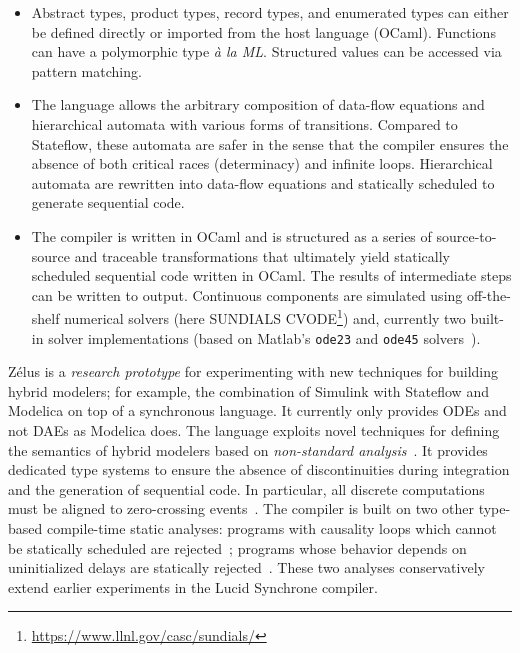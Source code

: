 \documentclass[11pt,titlepage,twoside]{report}
\newenvironment{flatitemize}
  {\begin{itemize}[leftmargin=*]}
  {\end{itemize}}
\newcommand{\zelus}{{\sf Z\'elus}}
\newcommand{\lucy}{{\sf Lucid Synchrone}}
\newcommand{\simulink}{{\sf Simulink}}
\newcommand{\stateflow}{{\sf Stateflow}}
\newcommand{\modelica}{{\sf Modelica}}
\newcommand{\ocaml}{{\sf OCaml}}
\begin{document}
\begin{flatitemize}
\item
Abstract types,
product types, record types, and enumerated types can either be defined 
directly or imported
from the host language (\ocaml). Functions can have a polymorphic type 
\emph{à
  la ML}. Structured values can be accessed via pattern matching.
\item
The language allows the arbitrary composition of data-flow equations and 
hierarchical
automata with various forms of transitions. Compared to \stateflow,
these automata are safer in the sense that the compiler ensures the absence 
of both critical races (determinacy) and infinite loops.
Hierarchical
automata are rewritten into data-flow
equations and statically scheduled to generate sequential code.
\item
The compiler is written in \ocaml{} and is structured as a series of
source-to-source and traceable transformations that ultimately yield
statically scheduled sequential code written in \ocaml.
The results of intermediate steps can be written to output.
Continuous components are simulated using off-the-shelf
numerical solvers (here SUNDIALS
CVODE\footnote{\url{https://www.llnl.gov/casc/sundials/}}) and, currently
two built-in solver implementations (based on Matlab's \texttt{ode23} and
\texttt{ode45} solvers~\cite{ShampineRei:MatlabODE:1997}).
\end{flatitemize}

\zelus{} is a \emph{research prototype} for experimenting with new
techniques for building hybrid modelers; for example, the combination of
\simulink{} with \stateflow{} and \modelica{} on top of a synchronous
language. It currently only provides \acp{ODE} and not \acp{DAE} as
\modelica{} does. The language exploits novel techniques for defining
the semantics of hybrid modelers based on \emph{non-standard
  analysis}~\cite{lucy:jcss12}. It provides dedicated type systems to
ensure the absence of discontinuities during integration and the
generation of sequential code. In particular, all discrete
computations must be aligned to zero-crossing
events~\cite{lucy:lctes11,lucy:emsoft11}. The compiler is built on two
other type-based compile-time static analyses: programs with causality
loops which cannot be statically scheduled are
rejected~\cite{lucy:hscc14}; programs whose behavior depends on
uninitialized delays are statically rejected~\cite{lucy:sttt04}. These two
analyses conservatively extend earlier experiments in
the \lucy{} compiler.
\end{document}
